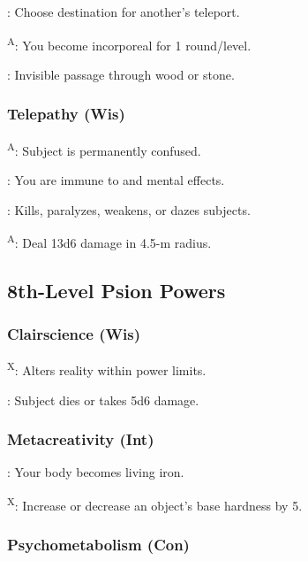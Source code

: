: Choose destination for another's teleport.

\textsuperscript{A}: You become incorporeal for 1 round/level.

: Invisible passage through wood or stone.


\subsubsection{Telepathy (Wis)}

\textsuperscript{A}: Subject is permanently confused.

: You are immune to  and mental effects.

: Kills, paralyzes, weakens, or dazes subjects.

\textsuperscript{A}: Deal 13d6 damage in 4.5-m radius.



\subsection{8th-Level Psion Powers}


\subsubsection{Clairscience (Wis)}

\textsuperscript{X}: Alters reality within power limits.

: Subject dies or takes 5d6 damage.


\subsubsection{Metacreativity (Int)}

: Your body becomes living iron.

\textsuperscript{X}: Increase or decrease an object's base hardness by 5.




\subsubsection{Psychometabolism (Con)}

